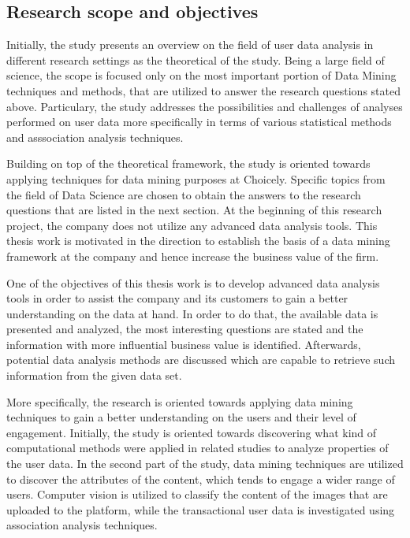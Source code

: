 \subsection{Research scope and objectives}
    Initially, the study presents an overview on the field of user data analysis in different research settings as the theoretical of the study. Being a large field of science, the scope is focused only on the most important portion of Data Mining techniques and methods, that are utilized to answer the research questions stated above. Particulary, the study addresses the possibilities and challenges of analyses performed on user data more specifically in terms of various statistical methods and asssociation analysis techniques.    

    Building on top of the theoretical framework, the study is oriented towards applying techniques for data mining purposes at Choicely. Specific topics from the field of Data Science are chosen to obtain the answers to the research questions that are listed in the next section. At the beginning of this research project, the company does not utilize any advanced data analysis tools. This thesis work is motivated in the direction to establish the basis of a data mining framework at the company and hence increase the business value of the firm.  

    One of the objectives of this thesis work is to develop advanced data analysis tools in order to assist the company and its customers to gain a better understanding on the data at hand. In order to do that, the available data is presented and analyzed, the most interesting questions are stated and the information with more influential business value is identified. Afterwards, potential data analysis methods are discussed which are capable to retrieve such information from the given data set.  

    More specifically, the research is oriented towards applying data mining techniques to gain a better understanding on the users and their level of engagement. Initially, the study is oriented towards discovering what kind of  computational methods were applied in related studies to analyze properties of the user data. In the second part of the study, data mining techniques are utilized to discover the attributes of the content, which tends to engage a wider range of users. Computer vision is utilized to classify the content of the images that are uploaded to the platform, while the transactional user data is investigated using association analysis techniques. %

